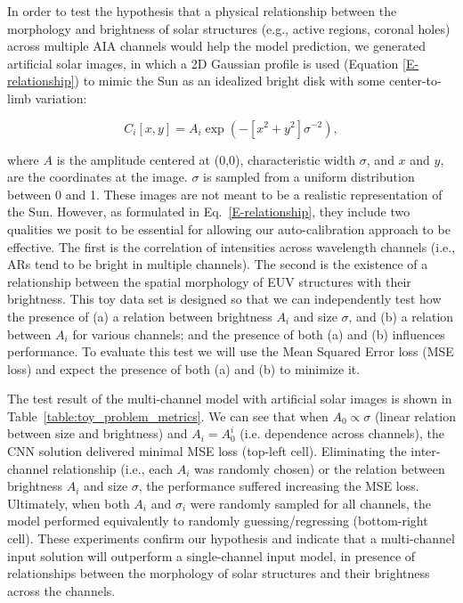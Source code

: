 \documentclass[twocolumn,usenames,dvipsnames]{aastex63}
\begin{document}
\label{section:inter_channel}


In order to test the hypothesis that a physical relationship between the morphology and brightness of solar structures (e.g., active regions, coronal holes) across multiple AIA channels would help the model prediction, we generated artificial solar images, in which a 2D Gaussian profile is used (Equation \ref{E-relationship}) to mimic the Sun as an idealized bright disk with some center-to-limb variation:

\begin{equation}
\label{E-relationship}
    C_i[x,y] = A_i \exp{(-[x^2+y^2]{\sigma^{-2}})},
\end{equation}

where $A$ is the amplitude centered at (0,0), characteristic width $\sigma$, and $x$ and $y$, are the coordinates at the image. $\sigma$ is sampled from a uniform distribution between 0 and 1. These images are not meant to be a realistic representation of the Sun. However, as formulated in Eq.~\ref{E-relationship}, they include two qualities we posit to be essential for allowing our auto-calibration approach to be effective. The first is the correlation of intensities across wavelength channels (i.e., ARs tend to be bright in multiple channels). The second is the existence of a relationship between the spatial morphology of EUV structures with their brightness. This toy data set is designed so that we can independently test how the presence of (a) a relation between brightness $A_i$ and size $\sigma$, and  (b) a relation between $A_i$ for various channels; and the presence of both (a) and (b) influences performance. To evaluate this test we will use the Mean Squared Error loss (MSE loss) and expect the presence of both (a) and (b) to minimize it.

The test result of the multi-channel model with artificial solar images is shown in Table~\ref{table:toy_problem_metrics}. We can see that when $A_0 \propto \sigma$ (linear relation between size and brightness) and $A_i = A_0^i$ (i.e. dependence across channels), the CNN solution delivered minimal MSE loss (top-left cell). Eliminating the inter-channel relationship (i.e., each $A_i$ was randomly chosen) or the relation between brightness $A_i$ and size $\sigma$, the performance suffered increasing the MSE loss. Ultimately, when both $A_i$ and $\sigma_i$ were randomly sampled for all channels, the model performed equivalently to randomly guessing/regressing (bottom-right cell). These experiments confirm our hypothesis and indicate that a multi-channel input solution will outperform a single-channel input model, in presence of relationships between the morphology of solar structures and their brightness across the channels. 
\end{document}
